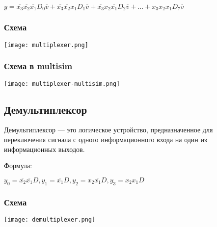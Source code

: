 \documentclass{article}
\begin{document}
\begin{flushleft}
$y = \overline{x_3}\overline{x_2}\overline{x_1}D_0\overline{v} + \overline{x_3}\overline{x_2}x_1D_1\overline{v} + \overline{x_3}x_2\overline{x_1}D_2\overline{v} + ... + x_3x_2x_1D_7\overline{v}$

\subsubsection{Схема}

\texttt{[image: multiplexer.png]}

\subsubsection{Схема в multisim}

\texttt{[image: multiplexer-multisim.png]}

\subsection{Демультиплексор}

Демультиплексор — это логическое устройство, предназначенное для переключения сигнала с одного информационного входа на один из информационных выходов.

\hfill

Формула:

$y_0 = \overline{x_2} \overline{x_1} D, y_1 = \overline{x_1}D, y_2 = x_2\overline{x_1}D, y_3 = x_2 x_1 D$

\subsubsection{Схема}

\texttt{[image: demultiplexer.png]}

\end{flushleft}
\end{document}
